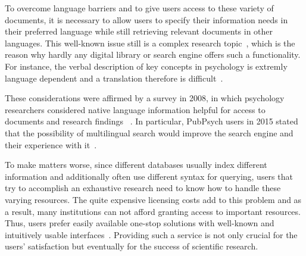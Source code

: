 \documentclass[a4paper,11pt]{article}
\begin{document}
To overcome language barriers and to give users access to these variety of documents, it is necessary to allow users to specify their information needs in their preferred language while still retrieving relevant documents in other languages. This well-known issue still is a complex research topic~\cite{diekema:2012}, which is the reason why hardly any digital library or search engine offers such a functionality. For instance, the verbal description of key concepts in psychology is extremly language dependent and a translation therefore is difficult~\cite{kornadt:1994}. %

These considerations were affirmed by a survey in 2008, in which psychology researchers considered native language information helpful for access to documents and research findings ~\cite{uhl:2009}. In particular, PubPsych users in 2015 stated that the possibility of multilingual search would improve the search engine and their experience with it~\cite{waeldin:2015}.

To make matters worse, since different databases usually index different information and additionally often use different syntax for querying, users that try to accomplish an exhaustive research need to know how to handle these varying resources. The quite expensive licensing costs add to this problem and as a result, many institutions can not afford granting access to important resources. Thus, users prefer easily available one-stop solutions with well-known and intuitively usable interfaces~\cite{hearst:2009}. Providing such a service is not only crucial for the users' satisfaction but eventually for the success of scientific research.

\end{document}

